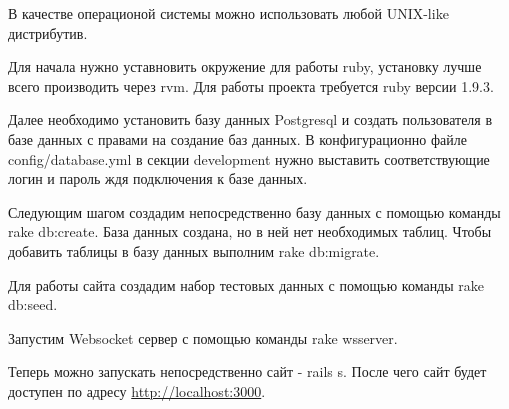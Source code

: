 В качестве операционой системы можно использовать любой UNIX-like дистрибутив.

Для начала нужно уставновить окружение для работы ruby, установку лучше всего
производить через rvm. Для работы проекта требуется ruby версии 1.9.3.

Далее необходимо установить базу данных Postgresql и создать пользователя в базе
данных с правами на создание баз данных. В конфигурационно файле
config/database.yml в секции development нужно выставить соответствующие логин и
пароль ждя подключения к базе данных.

Следующим шагом создадим непосредственно базу данных с помощью команды rake
db:create. База данных создана, но в ней нет необходимых таблиц. Чтобы добавить
таблицы в базу данных выполним rake db:migrate.

Для работы сайта создадим набор тестовых данных с помощью команды rake db:seed.

Запустим Websocket сервер с помощью команды rake wsserver.

Теперь можно запускать непосредственно сайт - rails s. После чего сайт будет
доступен по адресу \url{http://localhost:3000}.